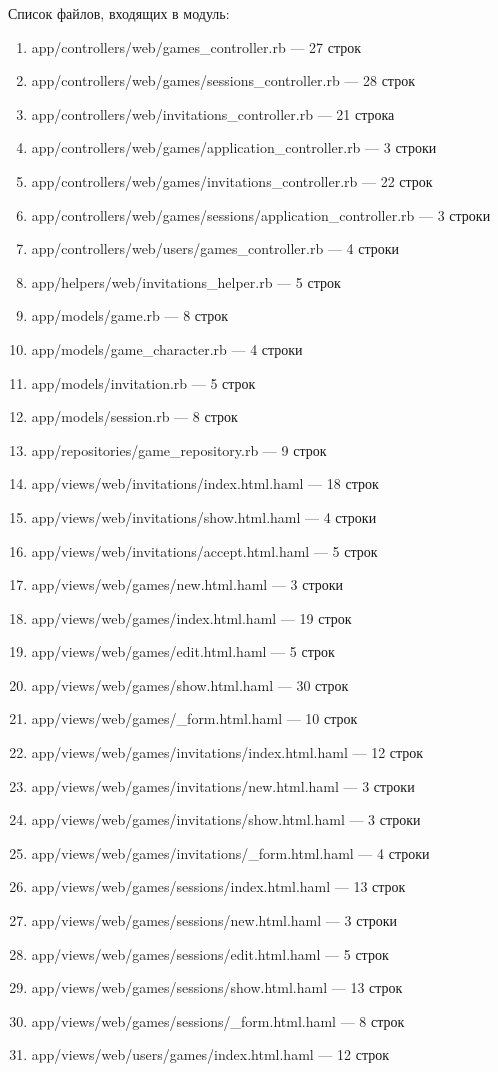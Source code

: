Список файлов, входящих в модуль:
\begin{enumerate}[label=\arabic*)]
\item app/controllers/web/games\_controller.rb --- 27 строк
\item app/controllers/web/games/sessions\_controller.rb --- 28 строк
\item app/controllers/web/invitations\_controller.rb --- 21 строка
\item app/controllers/web/games/application\_controller.rb --- 3 строки
\item app/controllers/web/games/invitations\_controller.rb --- 22 строк
\item app/controllers/web/games/sessions/application\_controller.rb --- 3 строки
\item app/controllers/web/users/games\_controller.rb --- 4 строки
\item app/helpers/web/invitations\_helper.rb --- 5 строк
\item app/models/game.rb --- 8 строк
\item app/models/game\_character.rb --- 4 строки
\item app/models/invitation.rb --- 5 строк
\item app/models/session.rb --- 8 строк
\item app/repositories/game\_repository.rb --- 9 строк
\item app/views/web/invitations/index.html.haml --- 18 строк
\item app/views/web/invitations/show.html.haml --- 4 строки
\item app/views/web/invitations/accept.html.haml --- 5 строк
\item app/views/web/games/new.html.haml --- 3 строки
\item app/views/web/games/index.html.haml --- 19 строк
\item app/views/web/games/edit.html.haml --- 5 строк
\item app/views/web/games/show.html.haml --- 30 строк
\item app/views/web/games/\_form.html.haml --- 10 строк
\item app/views/web/games/invitations/index.html.haml --- 12 строк
\item app/views/web/games/invitations/new.html.haml --- 3 строки
\item app/views/web/games/invitations/show.html.haml --- 3 строки
\item app/views/web/games/invitations/\_form.html.haml --- 4 строки
\item app/views/web/games/sessions/index.html.haml --- 13 строк
\item app/views/web/games/sessions/new.html.haml --- 3 строки
\item app/views/web/games/sessions/edit.html.haml --- 5 строк
\item app/views/web/games/sessions/show.html.haml --- 13 строк
\item app/views/web/games/sessions/\_form.html.haml --- 8 строк
\item app/views/web/users/games/index.html.haml --- 12 строк
\end{enumerate}



